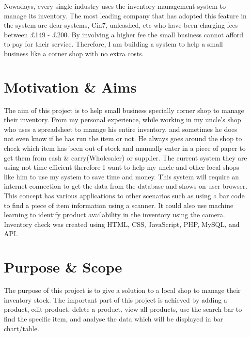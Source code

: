 Nowadays, every single industry uses the inventory management system to manage its inventory. The most leading company that has adopted this feature in the system are dear systems, Cin7, unleashed, etc who have been charging fees between £149 - £200. By involving a higher fee the small business cannot afford to pay for their service. Therefore, I am building a system to help a small business like a corner shop with no extra costs.

\section{Motivation \& Aims}
The aim of this project is to help small business specially corner shop to manage their inventory. From my personal experience, while working in my uncle's shop who uses a spreadsheet to manage his entire inventory, and sometimes he does not even know if he has run the item or not. He always goes around the shop to check which item has been out of stock and manually enter in a piece of paper to get them from cash \& carry(Wholesaler) or supplier. The current system they are using not time efficient therefore I want to help my uncle and other local shops like him to use my system to save time and money. This system will require an internet connection to get the data from the database and shows on user browser.\newline
\newline This concept has various applications to other scenarios such as using a bar code to find a piece of item information using a scanner. It could also use machine learning to identify product availability in the inventory using the camera. Inventory check was created using HTML, CSS, JavaScript, PHP, MySQL, and API.

\section{Purpose \& Scope}
The purpose of this project is to give a solution to a local shop to manage their inventory stock. The important part of this project is achieved by adding a product, edit product, delete a product, view all products, use the search bar to find the specific item, and analyse the data which will be displayed in bar chart/table.


